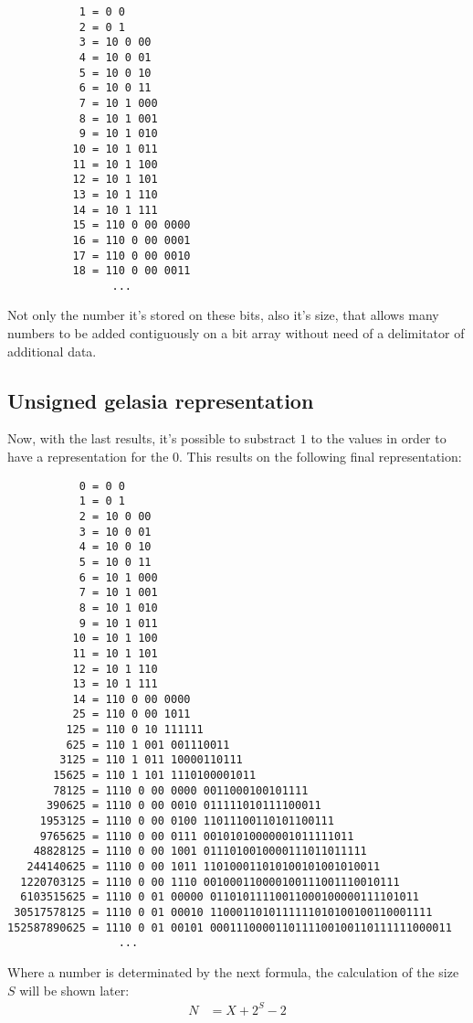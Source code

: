 \documentclass[a4paper,11pt]{article}
\begin{document}
\begin{center} \begin{lstlisting}
           1 = 0 0 
           2 = 0 1
           3 = 10 0 00
           4 = 10 0 01 
           5 = 10 0 10 
           6 = 10 0 11 
           7 = 10 1 000 
           8 = 10 1 001 
           9 = 10 1 010 
          10 = 10 1 011 
          11 = 10 1 100 
          12 = 10 1 101 
          13 = 10 1 110 
          14 = 10 1 111 
          15 = 110 0 00 0000 
          16 = 110 0 00 0001 
          17 = 110 0 00 0010 
          18 = 110 0 00 0011 
	      		...	
\end{lstlisting} \end{center}
Not only the number it's stored on these bits, also it's size, that allows many numbers to be added contiguously on a bit array without need of a delimitator of additional data.
\subsection{Unsigned gelasia representation}
Now, with the last results, it's possible to substract $1$ to the values in order to have a representation for the $0$. This results on the following final representation:
\begin{center} \begin{lstlisting}
           0 = 0 0 
           1 = 0 1
           2 = 10 0 00
           3 = 10 0 01 
           4 = 10 0 10 
           5 = 10 0 11 
           6 = 10 1 000 
           7 = 10 1 001 
           8 = 10 1 010 
           9 = 10 1 011 
          10 = 10 1 100 
          11 = 10 1 101 
          12 = 10 1 110 
          13 = 10 1 111 
          14 = 110 0 00 0000
          25 = 110 0 00 1011 
         125 = 110 0 10 111111 
         625 = 110 1 001 001110011 
        3125 = 110 1 011 10000110111 
       15625 = 110 1 101 1110100001011 
       78125 = 1110 0 00 0000 0011000100101111 
      390625 = 1110 0 00 0010 011111010111100011 
     1953125 = 1110 0 00 0100 11011100110101100111 
     9765625 = 1110 0 00 0111 00101010000001011111011 
    48828125 = 1110 0 00 1001 0111010010000111011011111 
   244140625 = 1110 0 00 1011 110100011010100101001010011 
  1220703125 = 1110 0 00 1110 001000110000100111001110010111 
  6103515625 = 1110 0 01 00000 01101011110011000100000111101011 
 30517578125 = 1110 0 01 00010 1100011010111111010100100110001111 
152587890625 = 1110 0 01 00101 0001110000110111100100110111111000011
	             ...	
\end{lstlisting} \end{center}
Where a number is determinated by the next formula, the calculation of the size $S$ will be shown later:
\begin{align*}
	N &= X+2^{S}-2
\end{align*}
\end{document}
